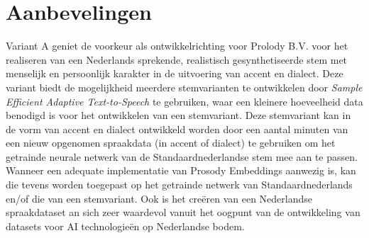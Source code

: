 \section{Aanbevelingen}
Variant A geniet de voorkeur als ontwikkelrichting voor Prolody B.V. voor het realiseren van een Nederlands sprekende, realistisch gesynthetiseerde stem met menselijk en persoonlijk karakter in de uitvoering van accent en dialect. Deze variant biedt de mogelijkheid meerdere stemvarianten te ontwikkelen door \textit{Sample Efficient Adaptive Text-to-Speech} te gebruiken, waar een kleinere hoeveelheid data benodigd is voor het ontwikkelen van een stemvariant. Deze stemvariant kan in de vorm van accent en dialect ontwikkeld worden door een aantal minuten van een nieuw opgenomen spraakdata (in accent of dialect) te gebruiken om het getrainde neurale netwerk van de Standaardnederlandse stem mee aan te passen. Wanneer een adequate implementatie van Prosody Embeddings aanwezig is, kan die tevens worden toegepast op het getrainde netwerk van Standaardnederlands en/of die van een stemvariant. Ook is het creëren van een Nederlandse spraakdataset an sich zeer waardevol vanuit het oogpunt van de ontwikkeling van datasets voor AI technologieën op Nederlandse bodem.

